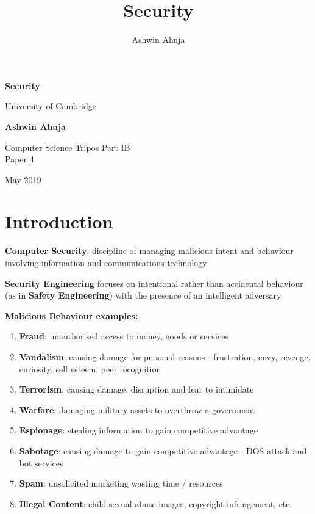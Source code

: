\documentclass{article}
\title{Security}
\author{Ashwin Ahuja}
\newenvironment{definition}{\par\color{blue}}{\par}
\begin{document}
\makeatletter
\renewcommand{\l@subsection}{\@dottedtocline{2}{1.6em}{2.6em}}
\makeatother

\begin{titlepage}
\begin{center}
			\vspace*{1cm}
			
			\Huge
			\textbf{Security}
			
			\vspace{0.5cm}
			\LARGE
			University of Cambridge
			
			\vspace{1.5cm}
			
			\textbf{Ashwin Ahuja}
			
			\vfill
			
			Computer Science Tripos Part IB\\
			Paper 4
			
			\vspace{5cm}
			
			May 2019
			
\end{center}
\end{titlepage}

\tableofcontents
\pagebreak
\section{Introduction}
\begin{definition}
	\textbf{Computer Security}: discipline of managing malicious intent and behaviour involving information and communications technology
	
	\noindent
	\textbf{Security Engineering} focuses on intentional rather than accidental behaviour (as in \textbf{Safety Engineering}) with the presence of an intelligent adversary
\end{definition}

\bigskip
\noindent
\textbf{Malicious Behaviour examples:}
\begin{enumerate}
	\item \textbf{Fraud}: unauthorised access to money, goods or services
	\item \textbf{Vandalism}: causing damage for personal reasons - frustration, envy, revenge, curiosity, self esteem, peer recognition
	\item \textbf{Terrorism}: causing damage, disruption and fear to intimidate
	\item \textbf{Warfare}: damaging military assets to overthrow a government
	\item \textbf{Espionage}: stealing information to gain competitive advantage
	\item \textbf{Sabotage}: causing damage to gain competitive advantage - DOS attack and bot services
	\item \textbf{Spam}: unsolicited marketing wasting time / resources
	\item \textbf{Illegal Content}: child sexual abuse images, copyright infringement, etc
\end{enumerate}
\end{document}
